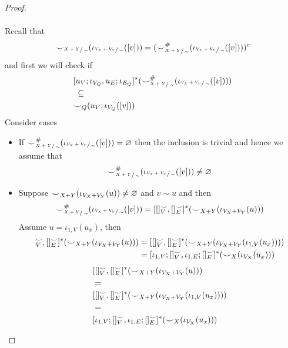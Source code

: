\begin{proof}
\begin{enumerate}
\begin{align*}
    \end{align*}
    Recall that
    \[
      {\smile}_{\sfrac{X+Y}{\sim}}(\iota_{\sfrac{V_{X} + V_{Y}}{\sim}}([v])) = ({\smile}^{{\#}}_{\sfrac{X+Y}{\sim}}(\iota_{\sfrac{V_{X} + V_{Y}}{\sim}}([v])))^{c}
    \]
    and first we will check if
    \begin{align*}
      &[u_{V};\iota_{V_{Q}}, u_{E};\iota_{E_{Q}}]^{*}({\smile}_{\sfrac{X+Y}{\sim}}^{{\#}}(\iota_{\sfrac{V_{X} + V_{Y}}{\sim}}([v])))\\
      &\;\subseteq\\
      &{\smile}_{Q}(u_{V};\iota_{V_{Q}}([v]))
    \end{align*}
    Consider cases
    \begin{itemize}
        \item If ${\smile}_{\sfrac{X+Y}{\sim}}^{{\#}}(\iota_{\sfrac{V_{X} + V_{Y}}{\sim}}([v])) = \varnothing$ then the inclusion is trivial and hence we assume that
        \[
            {\smile}_{\sfrac{X+Y}{\sim}}^{{\#}}(\iota_{\sfrac{V_{X} + V_{Y}}{\sim}}([v])) \not = \varnothing
        \]
        \item Suppose ${\smile}_{X+Y}(\iota_{V_{X} + V_{Y}}(u)) \not = \varnothing$ and $v \sim u$ and then
        \[
            {\smile}_{\sfrac{X+Y}{\sim}}^{{\#}}(\iota_{\sfrac{V_{X} + V_{Y}}{\sim}}([v])) = [[]_{V}^{{\smile}},[]_{E}^{{\smile}}]^{*}({\smile}_{X+Y}(\iota_{V_{X}+V_{Y}}(u)))
        \]
        Assume $u = \iota_{1,V}(u_{x})$, then
        \ifdefined \ONECOLUMN
        \begin{align*}
            [[]_{V}^{\consistency},[]_{E}^{\consistency}]^{*}(\consistency_{X+Y}(\iota_{V_{X}+V_{Y}}(u)))
            &=
            [[]_{V}^{\consistency},[]_{E}^{\consistency}]^{*}(\consistency_{X+Y}(\iota_{V_{X}+V_{Y}}(\iota_{1,V}(u_{x}))))\\
            &=
            [\iota_{1,V};[]_{V}^{\consistency},\iota_{1,E};[]_{E}^{\consistency}]^{*}(\consistency_{X}(\iota_{V_{X}}(u_{x})))
        \end{align*}
        \else
        \begin{align*}
            &[[]_{V}^{{\smile}},[]_{E}^{{\smile}}]^{*}({\smile}_{X+Y}(\iota_{V_{X}+V_{Y}}(u)))\\
            &=\\
            &[[]_{V}^{{\smile}},[]_{E}^{{\smile}}]^{*}({\smile}_{X+Y}(\iota_{V_{X}+V_{Y}}(\iota_{1,V}(u_{x}))))\\
            &=\\
            &[\iota_{1,V};[]_{V}^{{\smile}},\iota_{1,E};[]_{E}^{{\smile}}]^{*}({\smile}_{X}(\iota_{V_{X}}(u_{x})))
        \end{align*}
        \fi


\end{itemize}
\end{enumerate}
\end{proof}
